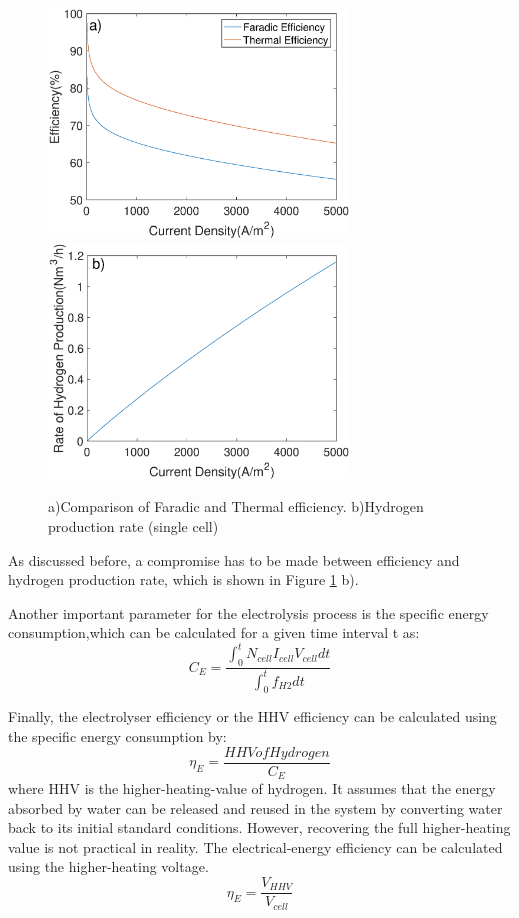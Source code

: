 \begin{figure}[H]
\includegraphics[width=8cm]{efficiency.eps} 
\includegraphics[width=8cm]{rate.eps}
\caption{a)Comparison of Faradic and Thermal efficiency. b)Hydrogen production rate (single cell)}
\label{fig:my}
\end{figure} 

As discussed before, a compromise has to be made between efficiency and hydrogen production rate, which is shown in Figure \ref{fig:my} b).

Another important parameter for the electrolysis process is the specific energy consumption,which can be calculated for a given time interval t as:\cite{efficiency2}
\begin{equation}
C_E = \frac{\int_{0}^{t} N_{cell}  {I_{cell}}  V_{cell} dt}{\int_{0}^{t} f_{H2}dt}
\end{equation}

Finally, the electrolyser efficiency or the HHV efficiency can be calculated using the specific energy consumption by:\cite{efficiency2}
\begin{equation}
\eta_E = \frac{HHV of Hydrogen}{C_E} 
\end{equation}
where HHV is the higher-heating-value of hydrogen. It assumes that the energy absorbed by water can be released and reused in the system by converting water back to its initial standard conditions. However, recovering the full higher-heating value is not practical in reality.
The electrical-energy efficiency can be calculated using the higher-heating voltage.\cite{efficiency} \cite{efficiency2} 
\begin{equation}
\eta_E=\frac{V_{HHV}}{V_{cell}}
\end{equation}

